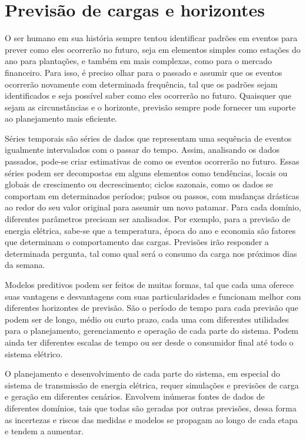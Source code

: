\documentclass[
	12pt,				%
	oneside,			%
	a4paper,			%
	english,			%
	brazil				%
	]{abntex2}
\begin{document}
\section{Previsão de cargas e horizontes}
	
	O ser humano em sua história sempre tentou identificar padrões em eventos para prever como eles ocorrerão no futuro, seja em elementos simples como estações do ano para plantações, e também em mais complexas, como para o mercado financeiro. Para isso, é preciso olhar para o passado e assumir que os eventos ocorrerão novamente com determinada frequência, tal que os padrões sejam identificados e seja possível saber como eles ocorrerão no futuro.  Quaisquer que sejam as circunstâncias e o horizonte, previsão sempre pode fornecer um suporte ao planejamento mais eficiente.
	
	Séries temporais são séries de dados que representam uma sequência de eventos igualmente intervalados com o passar do tempo. Assim, analisando os dados passados, pode-se criar estimativas de como os eventos ocorrerão no futuro. Essas séries podem ser decompostas em alguns elementos como tendências, locais ou globais de crescimento ou decrescimento; ciclos sazonais, como os dados se comportam em determinados períodos; pulsos ou passos, com mudanças drásticas ao redor do seu valor original para assumir um novo patamar. Para cada domínio, diferentes parâmetros precisam ser analisados. Por exemplo, para a previsão de energia elétrica, sabe-se que a temperatura, época do ano e economia são fatores que determinam o comportamento das cargas. Previsões irão responder a determinada pergunta, tal como qual será o consumo da carga nos próximos dias da semana. 
	
	Modelos preditivos podem ser feitos de muitas formas, tal que cada uma oferece suas vantagens e desvantagens com suas particularidades e funcionam melhor com diferentes horizontes de previsão. São o período de tempo para cada previsão que podem ser de longo, médio ou curto prazo, cada uma com diferentes utilidades para o planejamento, gerenciamento e operação de cada parte do sistema. Podem ainda ter diferentes escalas de tempo ou ser desde o consumidor final até todo o sistema elétrico. \cite{ReviewSmartMeterLoadForecastingTechniques}
	

	
	O planejamento e desenvolvimento de cada parte do sistema, em especial do sistema de transmissão de energia elétrica, requer simulações e previsões de carga e geração em diferentes cenários. Envolvem inúmeras fontes de dados de diferentes domínios, tais que todas são geradas por outras previsões, dessa forma as incertezas e riscos das medidas e modelos se propagam ao longo de cada etapa e tendem a aumentar. 
	
\end{document}
